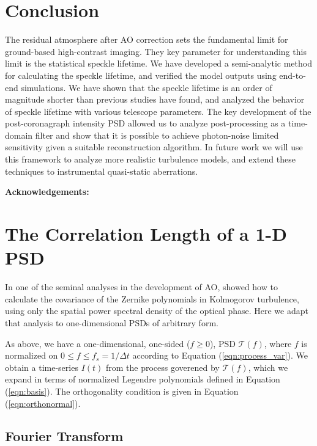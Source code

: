 \documentclass[10pt,preprint]{aastex631}
\begin{document}
\section{Conclusion}
The residual atmosphere after AO correction sets the fundamental limit for ground-based high-contrast imaging.  They key parameter for understanding this limit is the statistical speckle lifetime.  We have developed a semi-analytic method for calculating the speckle lifetime, and verified the model outputs using end-to-end simulations.  We have shown that the speckle lifetime is an order of magnitude shorter than previous studies have found, and analyzed the behavior of speckle lifetime with various telescope parameters.  The key development of the post-coronagraph intensity PSD allowed us to analyze post-processing as a time-domain filter and show that it is possible to achieve photon-noise limited sensitivity given a suitable reconstruction algorithm. In future work we will use this framework to analyze more realistic turbulence models, and extend these techniques to instrumental quasi-static aberrations.  

\textbf{Acknowledgements:}

\clearpage
\appendix
\section{The Correlation Length of a 1-D PSD}
\label{app:tau_psd}

In one of the seminal analyses in the development of AO, \citet{1976JOSA...66..207N} showed how to calculate the covariance of the Zernike polynomials in Kolmogorov turbulence, using only the spatial power spectral density of the optical phase. Here we adapt that analysis to one-dimensional PSDs of arbitrary form.  

As above, we have a one-dimensional, one-sided ($f \ge 0$),  PSD $\mathcal{T}(f)$, where $f$ is normalized on $0 \leq f \leq f_s = 1/\Delta t$ according to Equation (\ref{eqn:process_var}).  We obtain a time-series $I(t)$ from the process goverened by $\mathcal{T}(f)$, which we expand in terms of normalized Legendre polynomials defined in Equation (\ref{eqn:basis}).  The orthogonality condition is given in Equation (\ref{eqn:orthonormal}).
 
\subsection{Fourier Transform}
\end{document}
